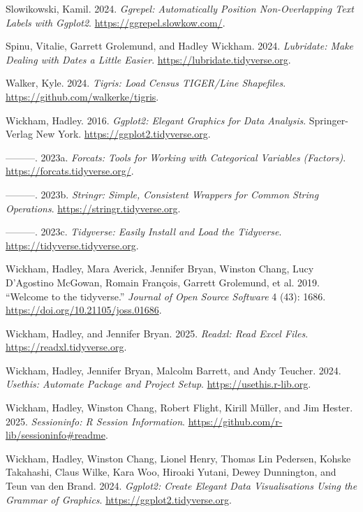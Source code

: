 \documentclass[
]{article}
\newlength{\cslhangindent}
\newenvironment{CSLReferences}[2] %
 {\begin{list}{}{%
  \setlength{\itemindent}{0pt}
  \setlength{\leftmargin}{0pt}
  \setlength{\parsep}{0pt}
  \ifodd #1
   \setlength{\leftmargin}{\cslhangindent}
   \setlength{\itemindent}{-1\cslhangindent}
  \fi
  \setlength{\itemsep}{#2\baselineskip}}}
 {\end{list}}
\begin{document}
\begin{CSLReferences}{1}{0}
Slowikowski, Kamil. 2024. \emph{Ggrepel: Automatically Position
Non-Overlapping Text Labels with Ggplot2}.
\url{https://ggrepel.slowkow.com/}.

Spinu, Vitalie, Garrett Grolemund, and Hadley Wickham. 2024.
\emph{Lubridate: Make Dealing with Dates a Little Easier}.
\url{https://lubridate.tidyverse.org}.

Walker, Kyle. 2024. \emph{Tigris: Load Census TIGER/Line Shapefiles}.
\url{https://github.com/walkerke/tigris}.

Wickham, Hadley. 2016. \emph{Ggplot2: Elegant Graphics for Data
Analysis}. Springer-Verlag New York.
\url{https://ggplot2.tidyverse.org}.

---------. 2023a. \emph{Forcats: Tools for Working with Categorical
Variables (Factors)}. \url{https://forcats.tidyverse.org/}.

---------. 2023b. \emph{Stringr: Simple, Consistent Wrappers for Common
String Operations}. \url{https://stringr.tidyverse.org}.

---------. 2023c. \emph{Tidyverse: Easily Install and Load the
Tidyverse}. \url{https://tidyverse.tidyverse.org}.

Wickham, Hadley, Mara Averick, Jennifer Bryan, Winston Chang, Lucy
D'Agostino McGowan, Romain François, Garrett Grolemund, et al. 2019.
{``Welcome to the {tidyverse}.''} \emph{Journal of Open Source Software}
4 (43): 1686. \url{https://doi.org/10.21105/joss.01686}.

Wickham, Hadley, and Jennifer Bryan. 2025. \emph{Readxl: Read Excel
Files}. \url{https://readxl.tidyverse.org}.

Wickham, Hadley, Jennifer Bryan, Malcolm Barrett, and Andy Teucher.
2024. \emph{Usethis: Automate Package and Project Setup}.
\url{https://usethis.r-lib.org}.

Wickham, Hadley, Winston Chang, Robert Flight, Kirill Müller, and Jim
Hester. 2025. \emph{Sessioninfo: R Session Information}.
\url{https://github.com/r-lib/sessioninfo\#readme}.

Wickham, Hadley, Winston Chang, Lionel Henry, Thomas Lin Pedersen,
Kohske Takahashi, Claus Wilke, Kara Woo, Hiroaki Yutani, Dewey
Dunnington, and Teun van den Brand. 2024. \emph{Ggplot2: Create Elegant
Data Visualisations Using the Grammar of Graphics}.
\url{https://ggplot2.tidyverse.org}.


\end{CSLReferences}
\end{document}
